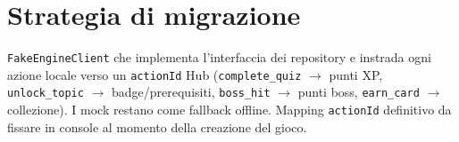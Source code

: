 \section{Strategia di migrazione}
\texttt{FakeEngineClient} che implementa l'interfaccia dei repository e
instrada ogni azione locale verso un \texttt{actionId} Hub
(\texttt{complete\_quiz} $\rightarrow$ punti XP, \texttt{unlock\_topic}
$\rightarrow$ badge/prerequisiti, \texttt{boss\_hit} $\rightarrow$ punti
boss, \texttt{earn\_card} $\rightarrow$ collezione). I mock restano come
fallback offline. Mapping \texttt{actionId} definitivo da fissare in console
al momento della creazione del gioco.
